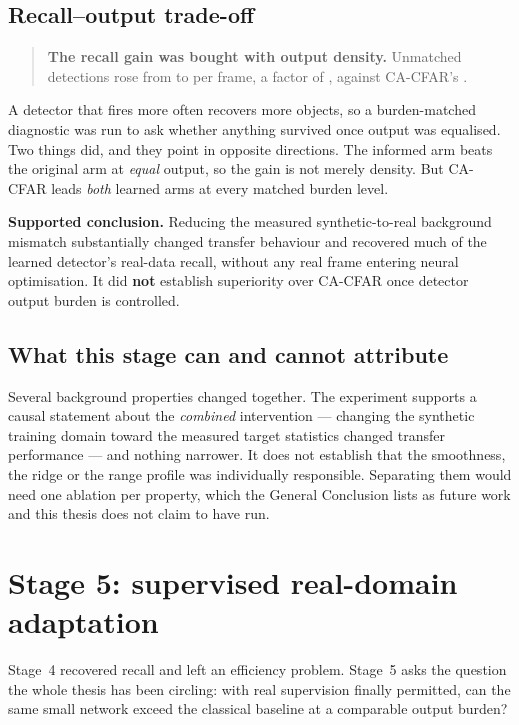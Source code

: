 \subsection{Recall--output trade-off}

\begin{quote}
\textbf{The recall gain was bought with output density.} Unmatched detections rose from
\CiTestBurdenOrig{} to \CiTestBurdenNew{} per frame, a factor of \CiTestBurdenRatio{}, against
CA-CFAR's \CiTestBurdenCFAR{}.
\end{quote}

A detector that fires more often recovers more objects, so a burden-matched diagnostic was run to ask
whether anything survived once output was equalised. Two things did, and they point in opposite
directions. The informed arm beats the original arm at \emph{equal} output, so the gain is not merely
density. But CA-CFAR leads \emph{both} learned arms at every matched burden level.

\textbf{Supported conclusion.} Reducing the measured synthetic-to-real background mismatch
substantially changed transfer behaviour and recovered much of the learned detector's real-data
recall, without any real frame entering neural optimisation. It did \textbf{not} establish
superiority over CA-CFAR once detector output burden is controlled.

\subsection{What this stage can and cannot attribute}

Several background properties changed together. The experiment supports a causal statement about the
\emph{combined} intervention --- changing the synthetic training domain toward the measured target
statistics changed transfer performance --- and nothing narrower. It does not establish that the
smoothness, the ridge or the range profile was individually responsible. Separating them would need
one ablation per property, which the General Conclusion lists as future work and this thesis does not
claim to have run.

\section{Stage 5: supervised real-domain adaptation}
\label{sec:stage5}

Stage~4 recovered recall and left an efficiency problem. Stage~5 asks the question the whole thesis
has been circling: with real supervision finally permitted, can the same small network exceed the
classical baseline at a comparable output burden?

